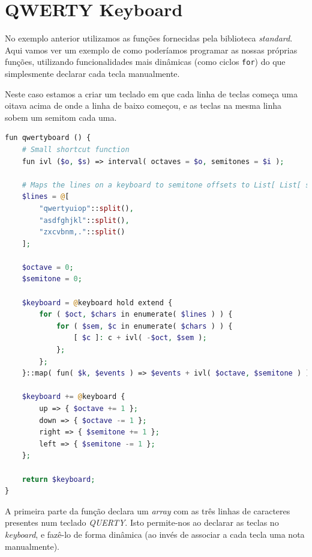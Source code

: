 \section{QWERTY Keyboard}
No exemplo anterior utilizamos as funções fornecidas pela biblioteca \textit{standard}. Aqui vamos ver um exemplo de como poderíamos programar as nossas próprias funções, utilizando funcionalidades mais dinâmicas (como ciclos \texttt{for}) do que simplesmente declarar cada tecla manualmente.

Neste caso estamos a criar um teclado em que cada linha de teclas começa uma oitava acima de onde a linha de baixo começou, e as teclas na mesma linha sobem um semitom cada uma.
\begin{lstlisting}[caption=Exemplo da sintaxe proposta da linguagem,language=PHP]
fun qwertyboard () {
    # Small shortcut function
    fun ivl ($o, $s) => interval( octaves = $o, semitones = $i );

    # Maps the lines on a keyboard to semitone offsets to List[ List[ str ] ]
    $lines = @[
        "qwertyuiop"::split(),
        "asdfghjkl"::split(),
        "zxcvbnm,."::split()
    ];
    
    $octave = 0;
    $semitone = 0;
    
    $keyboard = @keyboard hold extend {
        for ( $oct, $chars in enumerate( $lines ) ) {
            for ( $sem, $c in enumerate( $chars ) ) {
                [ $c ]: c + ivl( -$oct, $sem );
            };
        };
    }::map( fun( $k, $events ) => $events + ivl( $octave, $semitone ) );
    
    $keyboard += @keyboard {
        up => { $octave += 1 };
        down => { $octave -= 1 };
        right => { $semitone += 1 };
        left => { $semitone -= 1 };
    };
    
    return $keyboard;
}
\end{lstlisting}
A primeira parte da função declara um \textit{array} com as três linhas de caracteres presentes num teclado \textit{QUERTY}. Isto permite-nos ao declarar as teclas no \textit{keyboard}, e fazê-lo de forma dinâmica (ao invés de associar a cada tecla uma nota manualmente).

